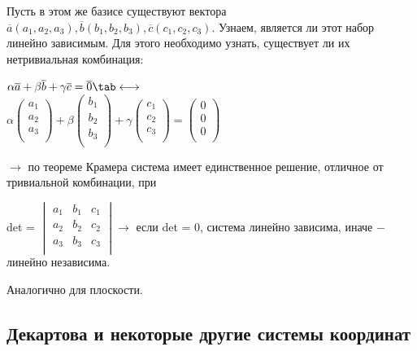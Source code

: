 Пусть в этом же базисе существуют вектора $\overline{a}(a_1, a_2, a_3), \overline{b}(b_1, b_2, b_3), \overline{c}(c_1, c_2, c_3)$. Узнаем, является ли этот набор линейно зависимым. Для этого необходимо узнать, существует ли их нетривиальная комбинация:

\begin{center}
	$\alpha\overline{a} + \beta\overline{b} + \gamma\overline{c} = \overline{0}\tab\longleftrightarrow$\\
	
	$\alpha
	\begin{pmatrix*}
		a_1\\
		a_2\\
		a_3\\
	\end{pmatrix*} + \beta
	\begin{pmatrix*}
		b_1\\
		b_2\\
		b_3\\
	\end{pmatrix*} + \gamma
	\begin{pmatrix*}
		c_1\\
		c_2\\
		c_3\\
	\end{pmatrix*} = 
	\begin{pmatrix*}
		0\\
		0\\
		0\\
	\end{pmatrix*}$
\end{center} $\longrightarrow$ по теореме Крамера система имеет единственное решение, отличное от тривиальной комбинации, при
\begin{center}
	det = 
	$\begin{vmatrix}
		a_1 & b_1 & c_1\\
		a_2 & b_2 & c_2\\
		a_3 & b_3 & c_3\\
	\end{vmatrix} \longrightarrow$ если det = 0, система линейно зависима, иначе $-$ линейно независима.
	
\end{center}

Аналогично для плоскости.

\subsection{Декартова и некоторые другие системы координат}

